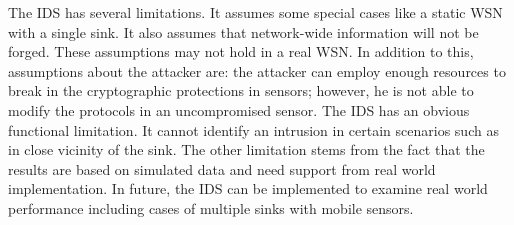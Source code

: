 \documentclass{CRPITStyle}
\begin{document}
The IDS has several limitations. 
It assumes some special cases like a static WSN with a single sink.
It also assumes that network-wide information will not be forged. %
These assumptions may not hold in a real WSN.
In addition to this, assumptions about the attacker are: the attacker can employ enough resources to break in the cryptographic protections in sensors; however, he is not able to modify the protocols in an uncompromised sensor.
The IDS has an obvious functional limitation.
It cannot identify an intrusion in certain scenarios such as 
in close vicinity of the sink.%
The other limitation stems from the fact that the results are based on simulated data and need support from real world implementation.
In future,  the IDS can be implemented to examine real world performance including cases of multiple sinks with mobile sensors.







\end{document}

